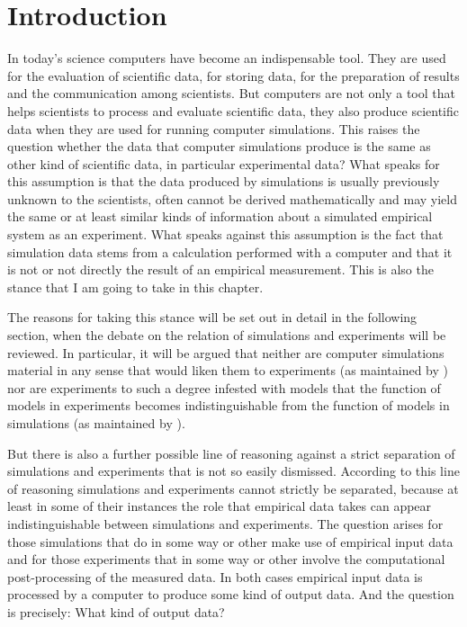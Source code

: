 \documentclass[12pt, a4paper]{article}
\numberwithin{equation}{section}
\begin{document}
\tableofcontents 


\section{Introduction}

In today's science computers have become an indispensable tool. They are used for the evaluation of scientific data, for storing data, for the preparation of results and the communication among scientists. But computers are not only a tool that helps scientists to process and evaluate scientific data, they also produce scientific data when they are used for running computer simulations. This raises the question whether the data that computer simulations produce is the same as other kind of scientific data, in particular experimental data? What speaks for this assumption is that the data produced by simulations is usually previously unknown to the scientists, often cannot be derived mathematically and may yield the same or at least similar kinds of information about a simulated empirical system as an experiment. What speaks against this assumption is the fact that simulation data stems from a calculation performed with a computer and that it is not or not directly the result of an empirical measurement. This is also the stance that I am going to take in this chapter.

The reasons for taking this stance will be set out in detail in the following section, when the debate on the relation of simulations and experiments will be reviewed. In particular, it will be argued that neither are computer simulations material in any sense that would liken them to experiments (as maintained by \citet{parker:2009}) nor are experiments to such a degree infested with models that the function of models in experiments becomes indistinguishable from the function of models in simulations (as maintained by \citet{morrison:2009}).

But there is also a further possible line of reasoning against a strict separation of simulations and experiments that is not so easily dismissed. According to this line of reasoning simulations and experiments cannot strictly be separated, because at least in some of their instances the role that empirical data takes can appear indistinguishable between simulations and experiments. The question arises for those simulations that do in some way or other make use of empirical input data and for those experiments that in some way or other involve the computational post-processing of the measured data. In both cases empirical input data is processed by a computer to produce some kind of output data. And the question is precisely: What kind of output data? 
\end{document}
